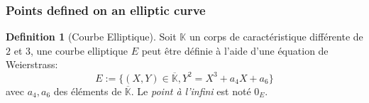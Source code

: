 \documentclass[10pt,a4paper]{beamer}
\theoremstyle{plain}
\theoremstyle{definition}
\theoremstyle{definition}
\theoremstyle{definition}
\theoremstyle{definition}
\newtheorem{defi}[thm]{Definition}
\theoremstyle{remark}
\theoremstyle{remark}
\begin{document}
\begin{frame}
\frametitle{Points defined on an elliptic curve}

\begin{defi}[Courbe Elliptique]
Soit $\mathbb{K}$ un corps de caractéristique différente de $2$ et $3$, une courbe elliptique $E$ peut être définie à l'aide d'une équation de Weierstrass: 
\begin{equation*}
\label{eq:weierstrass-proj}
E:=\{ (X,Y) \in \overline{\mathbb{K}} , Y^2=X^3+a_4X+a_6 \}
\end{equation*}
avec $a_4,a_6$ des éléments de $\overline{\mathbb{K}}$. Le \emph{point à l'infini} est noté $0_E$. 
\end{defi}

\begin{figure}
\begin{center}

\end{center}
\end{figure}
\end{frame}
\end{document}

